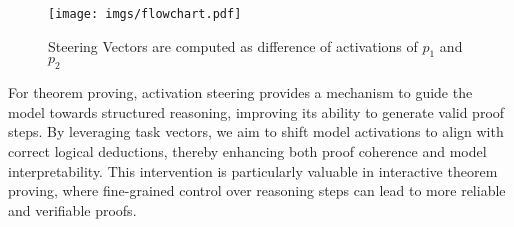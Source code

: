\begin{figure}[h]
    \centering
    \texttt{[image: imgs/flowchart.pdf]}
    \caption{Steering Vectors are computed as difference of activations of $p_{1}$ and $p_{2}$}
    \label{fig:flowchart}
\end{figure}

For theorem proving, activation steering provides a mechanism to guide the model towards structured reasoning, improving its ability to generate valid proof steps. By leveraging task vectors, we aim to shift model activations to align with correct logical deductions, thereby enhancing both proof coherence and model interpretability. This intervention is particularly valuable in interactive theorem proving, where fine-grained control over reasoning steps can lead to more reliable and verifiable proofs.

